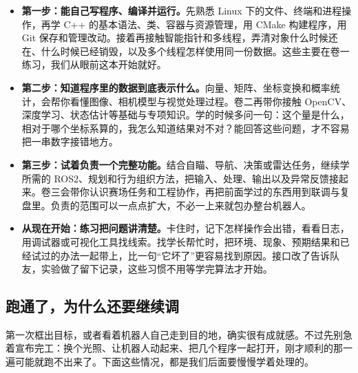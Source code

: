 \begin{itemize}
    \item \textbf{第一步：能自己写程序、编译并运行。}先熟悉 Linux 下的文件、终端和进程操作，再学 C++ 的基本语法、类、容器与资源管理，用 CMake 构建程序，用 Git 保存和管理改动。接着再接触智能指针和多线程，弄清对象什么时候还在、什么时候已经销毁，以及多个线程怎样使用同一份数据。这些主要在卷一练习，我们从眼前这本开始就好。
    \item \textbf{第二步：知道程序里的数据到底表示什么。}向量、矩阵、坐标变换和概率统计，会帮你看懂图像、相机模型与视觉处理过程。卷二再带你接触 OpenCV、深度学习、状态估计等基础与专项知识。学的时候多问一句：这个量是什么，相对于哪个坐标系算的，我怎么知道结果对不对？能回答这些问题，才不容易把一串数字接错地方。
    \item \textbf{第三步：试着负责一个完整功能。}结合自瞄、导航、决策或雷达任务，继续学所需的 ROS2、规划和行为组织方法，把输入、处理、输出以及异常反馈接起来。卷三会带你认识赛场任务和工程协作，再把前面学过的东西用到联调与复盘里。负责的范围可以一点点扩大，不必一上来就包办整台机器人。
    \item \textbf{从现在开始：练习把问题讲清楚。}卡住时，记下怎样操作会出错，看看日志，用调试器或可视化工具找线索。找学长帮忙时，把环境、现象、预期结果和已经试过的办法一起带上，比一句“它坏了”更容易找到原因。接口改了告诉队友，实验做了留下记录，这些习惯不用等学完算法才开始。
\end{itemize}

\subsection*{跑通了，为什么还要继续调}
第一次框出目标，或者看着机器人自己走到目的地，确实很有成就感。不过先别急着宣布完工：换个光照、让机器人动起来、把几个程序一起打开，刚才顺利的那一遍可能就跑不出来了。下面这些情况，都是我们后面要慢慢学着处理的。

